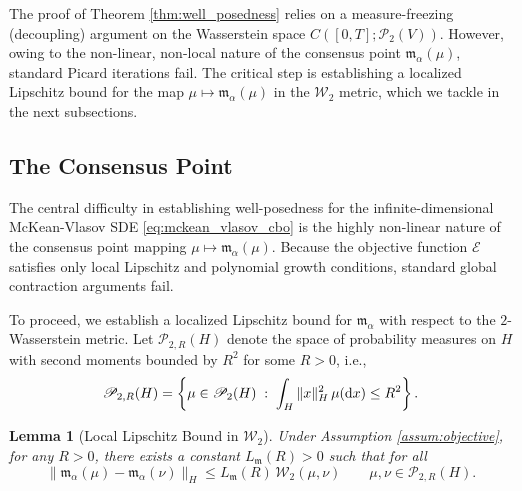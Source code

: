 \documentclass[12pt]{amsart}
\newcommand{\D}[1]{\mbox{\rm #1}}
\newcommand{\dd}{\D{d}}
\numberwithin{equation}{section}
\newtheorem{lemma}[theorem]{Lemma}
\begin{document}
The proof of Theorem \ref{thm:well_posedness} relies on a measure-freezing (decoupling) argument on the Wasserstein space $C([0,T]; \mathscr{P}_2(V))$. However, owing to the non-linear, non-local nature of the consensus point $\mathfrak{m}_\alpha(\mu)$, standard Picard iterations fail. The critical step is establishing a localized Lipschitz bound for the map $\mu \mapsto \mathfrak{m}_\alpha(\mu)$ in the $\mathcal{W}_2$ metric, which we tackle in the next subsections.



\subsection{The Consensus Point}
\label{sec:consensus_lipschitz}

The central difficulty in establishing well-posedness for the infinite-dimensional McKean-Vlasov SDE \eqref{eq:mckean_vlasov_cbo} is the highly non-linear nature of the consensus point mapping $\mu \mapsto \mathfrak{m}_\alpha(\mu)$. Because the objective function $\mathscr{E}$ satisfies only local Lipschitz and polynomial growth conditions, standard global contraction arguments fail. 

To proceed, we establish a localized Lipschitz bound for $\mathfrak{m}_\alpha$ with respect to the $2$-Wasserstein metric. Let  $\mathscr{P}_{2,R}(H)$ denote the space of probability measures on $H$ with second moments bounded by $R^2$ for some $R>0$, i.e.,
\begin{equation*}
    \mathscr{P}_{2,R}(H) = \left\{ \mu \in \mathscr{P}_2(H) \; : \; \int_H \|x\|_H^2 \,\mu(\dd x) \leq R^2 \right\}.
\end{equation*}

\begin{lemma}[Local Lipschitz Bound in $\mathcal{W}_2$]
\label{lem:local_lipschitz_m}
Under Assumption \ref{assum:objective}, for any $R > 0$, there exists a constant $L_{\mathfrak{m}}(R) > 0$ such that for all
\begin{equation*}
    \|\mathfrak{m}_\alpha(\mu) - \mathfrak{m}_\alpha(\nu)\|_H \leq L_{\mathfrak{m}}(R)\, \mathcal{W}_2(\mu, \nu) \qquad \mu, \nu \in \mathscr{P}_{2,R}(H).
\end{equation*}
\end{lemma}
\end{document}
